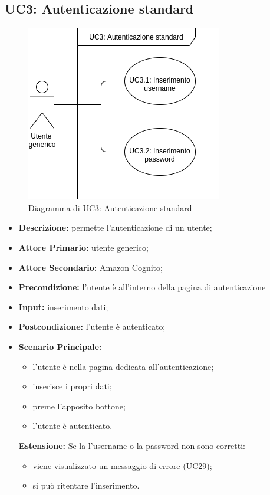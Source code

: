 \subsection{UC3: Autenticazione standard}
\begin{figure}[!ht]
    \caption{Diagramma di UC3: Autenticazione standard}
    \vspace{10px}
    \includegraphics[scale=0.5]{../../../Images/AnalisiRequisiti/UC03}
    \centering
\end{figure}
\label{sec:UC3}
\begin{itemize}
    \item \textbf{Descrizione:} permette l'autenticazione di un utente;
    \item \textbf{Attore Primario:} utente generico;
    \item \textbf{Attore Secondario:} Amazon Cognito;
    \item \textbf{Precondizione:} l'utente è all'interno della pagina di autenticazione
    \item \textbf{Input:} inserimento dati;
    \item \textbf{Postcondizione:} l'utente è autenticato;
    \item \textbf{Scenario Principale:} 
    \begin{itemize}
        \item l'utente è nella pagina dedicata all'autenticazione;
        \item inserisce i propri dati;
        \item preme l'apposito bottone;
        \item l'utente è autenticato.
    \end{itemize}
    \textbf{Estensione:}
        Se la l'username o la password non sono corretti:
        \begin{itemize}
            \item viene visualizzato un messaggio di errore (\hyperref[sec:UC29]{\underline{UC29}});
            \item si può ritentare l'inserimento.
        \end{itemize}
\end{itemize}
